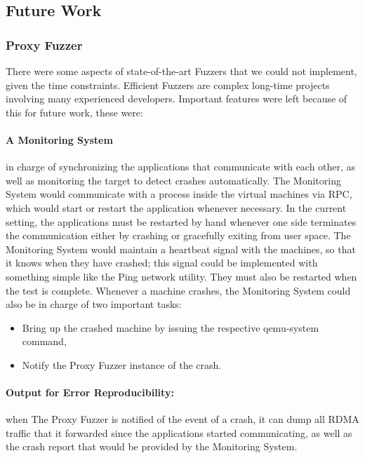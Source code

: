 \subsection{Future Work}

\subsubsection{Proxy Fuzzer}

There were some aspects of state-of-the-art Fuzzers that we could not implement, given the time constraints.
Efficient Fuzzers are complex long-time projects involving many experienced developers. Important features were left
because of this for future work, these were:

\paragraph{A Monitoring System} in charge of synchronizing the applications that communicate with each other,
as well as monitoring the target to detect crashes automatically. The Monitoring System would communicate
with a process inside the virtual machines via RPC, which would start or restart the application whenever necessary.
In the current setting, the applications must be restarted by hand whenever one side terminates the communication either by crashing
or gracefully exiting from user space. The Monitoring System would maintain a heartbeat signal with the machines, so that it knows when they have
crashed; this signal could be implemented with something simple like the Ping network utility.
They must also be restarted when the test is complete. Whenever a machine crashes, the Monitoring
System could also be in charge of two important tasks:

\begin{itemize}
\item Bring up the crashed machine by issuing the respective qemu-system command,
\item Notify the Proxy Fuzzer instance of the crash.
\end{itemize}

\paragraph{Output for Error Reproducibility:} when The Proxy Fuzzer is notified of the event of a crash, it can dump all
RDMA traffic that it forwarded since the applications started communicating, as well as the crash report
that would be provided by the Monitoring System.

